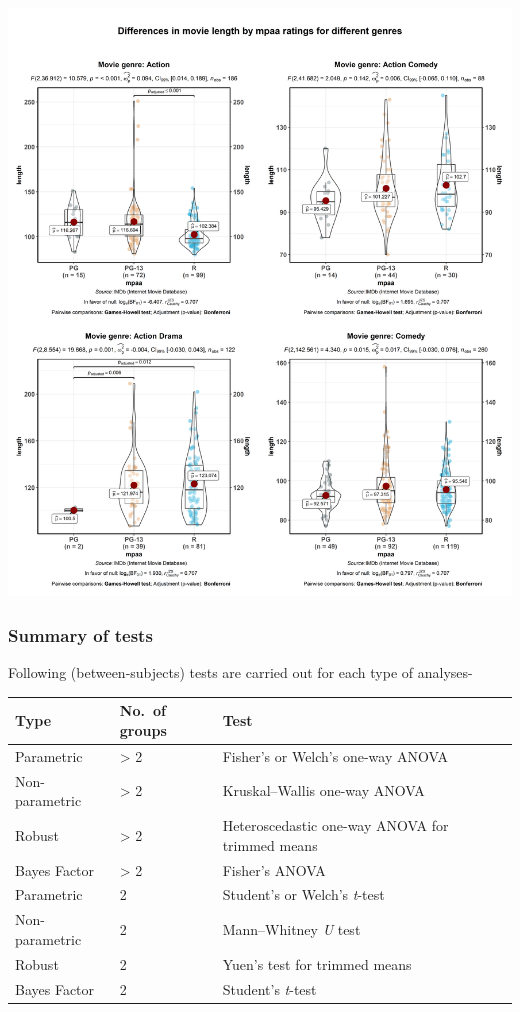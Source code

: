 \documentclass[
]{article}
\begin{document}
\includegraphics[width=1\linewidth]{./figures/paper-ggbetweenstats3-1}

\hypertarget{summary-of-tests}{%
\subsubsection{Summary of tests}\label{summary-of-tests}}

Following (between-subjects) tests are carried out for each type of analyses-

\begin{longtable}[]{@{}lll@{}}
\toprule
Type & No.~of groups & Test\tabularnewline
\midrule
\endhead
Parametric & \textgreater{} 2 & Fisher's or Welch's one-way ANOVA\tabularnewline
Non-parametric & \textgreater{} 2 & Kruskal--Wallis one-way ANOVA\tabularnewline
Robust & \textgreater{} 2 & Heteroscedastic one-way ANOVA for trimmed means\tabularnewline
Bayes Factor & \textgreater{} 2 & Fisher's ANOVA\tabularnewline
Parametric & 2 & Student's or Welch's \emph{t}-test\tabularnewline
Non-parametric & 2 & Mann--Whitney \emph{U} test\tabularnewline
Robust & 2 & Yuen's test for trimmed means\tabularnewline
Bayes Factor & 2 & Student's \emph{t}-test\tabularnewline
\bottomrule
\end{longtable}
\end{document}
